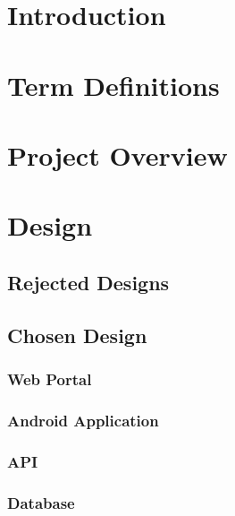 \documentclass[11pt,a4paper]{article}
\begin{document}


\newpage
\setcounter{page}{1}
\tableofcontents

\newpage
\setcounter{page}{1}
\section{Introduction}
\label{sec:introduction}
\section{Term Definitions}
\label{sec:term-definitions}
\section{Project Overview}
\label{sec:project-overview}

\section{Design}
\label{sec:design}
\subsection{Rejected Designs}
\label{sec:rejected-designs}
\subsection{Chosen Design}
\label{sec:chosen-designs}
\subsubsection{Web Portal}
\label{sec:web-portal-design}
\subsubsection{Android Application}
\label{sec:android-design}
\subsubsection{API}
\label{sec:api-design}
\subsubsection{Database}
\label{sec:database-design}
\end{document}
